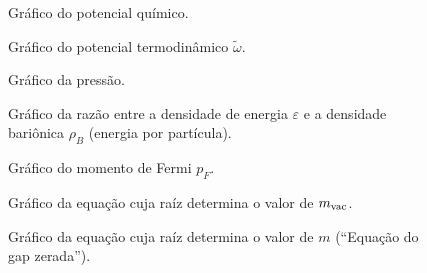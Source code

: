 \begin{figure}
	
	\caption{Gráfico do potencial químico. \protect}
	\label{Fig:chemical_potential_NJL-Buballa_Set_1}
\end{figure}

\begin{figure}
	
	\caption{Gráfico do potencial termodinâmico $\tilde{\omega}$. \protect}
	\label{Fig:thermodynamic_potential_NJL-Buballa_Set_1}
\end{figure}

\begin{figure}
	
	\caption{Gráfico da pressão. \protect}
	\label{Fig:pressure_NJL-Buballa_Set_1}
\end{figure}

\begin{figure}
	
	\caption{Gráfico da razão entre a densidade de energia $\varepsilon$ e a densidade bariônica $\rho_B$ (energia por partícula). \protect}
	\label{Fig:energy_density_per_particle_NJL-Buballa_Set_1}
\end{figure}

\FloatBarrier


\begin{figure}
	
	\caption{Gráfico do momento de Fermi $p_F$. \protect}
	\label{Fig:fermi_momentum_NJL-D_1}
\end{figure}

\begin{figure}
	
	\caption{Gráfico da equação cuja raíz determina o valor de $m_{\rm{vac}}$. \protect}
	\label{Fig:vacuum_mass_equation_NJL-D_1}
\end{figure}

\begin{figure}
	
	\caption{Gráfico da equação cuja raíz determina o valor de $m$ (``Equação do gap zerada''). \protect}
	\label{Fig:gap_NJL-D_1}
\end{figure}

